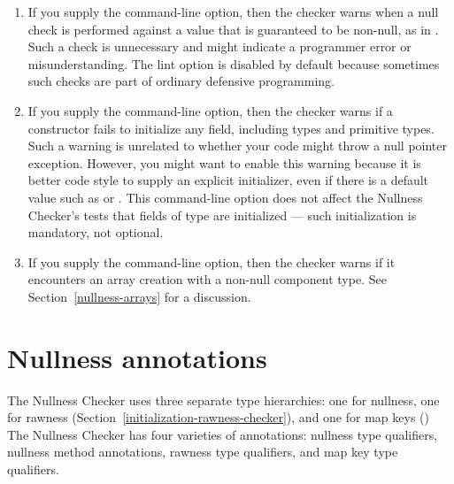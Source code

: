 \label{lint-nulltest-section}\label{lint-uninitialized-section}
\begin{enumerate}
\item
  \label{lint-nulltest-item}%
  If you supply the  command-line option, then the
  checker warns when a null check is performed against a value that is
  guaranteed to be non-null, as in .  Such a check is
  unnecessary and might indicate a programmer error or misunderstanding.
  The lint option is disabled by default because sometimes such checks are
  part of ordinary defensive programming.

\item
  \label{lint-uninitialized-item}%
  If you supply the  command-line option, then
  the checker warns if a constructor fails to initialize any field,
  including  types and primitive
  types.  Such a warning is unrelated to whether your code might throw a
  null pointer exception.  However, you might want to enable this warning
  because it is better code style to supply an explicit initializer, even
  if there is a default value such as  or .
  This command-line option does not affect the Nullness Checker's tests
  that fields of  type are
  initialized --- such initialization is mandatory, not optional.

\item
  \label{lint-nonnullarraycomponents-item}%
  If you supply the  command-line
  option, then the checker warns if it encounters an array creation
  with a non-null component type.
  See Section~\ref{nullness-arrays} for a discussion.

\end{enumerate}


\section{Nullness annotations\label{nullness-annotations}}

The Nullness Checker uses three separate type hierarchies:  one for nullness,
one for rawness (Section~\ref{initialization-rawness-checker}),
and one for map keys ()
The Nullness Checker has four varieties of annotations:  nullness
type qualifiers, nullness method annotations, rawness type qualifiers, and
map key type
qualifiers.


